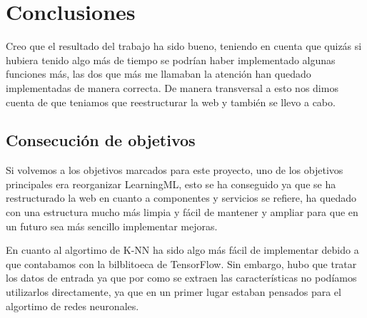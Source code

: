 \documentclass[a4paper, 12pt]{book}
\begin{document}






\cleardoublepage
\chapter{Conclusiones}
\label{chap:conclusiones}

Creo que el resultado del trabajo ha sido bueno, teniendo en cuenta que quizás si hubiera tenido algo más de tiempo se podrían haber implementado algunas funciones más, las dos que más me llamaban la atención han quedado implementadas de manera correcta. De manera transversal a esto nos dimos cuenta de que teniamos que reestructurar la web y también se llevo a cabo.

\section{Consecución de objetivos}
\label{sec:consecucion-objetivos}

Si volvemos a los objetivos marcados para este proyecto, uno de los objetivos principales era reorganizar LearningML, esto se ha conseguido ya que se ha restructurado la web en cuanto a componentes y servicios se refiere, ha quedado con una estructura mucho más limpia y fácil de mantener y ampliar para que en un futuro sea más sencillo implementar mejoras.

En cuanto al algortimo de K-NN ha sido algo más fácil de implementar debido a que contabamos con la bilblitoeca de TensorFlow. Sin embargo, hubo que tratar los datos de entrada ya que por como se extraen las características no podíamos utilizarlos directamente, ya que en un primer lugar estaban pensados para el algortimo de redes neuronales.
\end{document}
